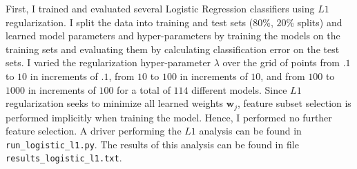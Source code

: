 \documentclass[11pt, oneside]{article}   	%
\begin{document}
First, I trained and evaluated several Logistic Regression classifiers using $L1$ regularization. I split the data into training and test sets ($80$\%, $20$\% splits) and learned model parameters and hyper-parameters by training the models on the training sets and evaluating them by calculating classification error on the test sets. I varied the regularization hyper-parameter $ \lambda $ over the grid of points from $.1$ to $10$ in increments of $.1$, from $10$ to $100$ in increments of $10$, and from $100$ to $1000$ in increments of $100$ for a total of $114$ different models. Since $L1$ regularization seeks to minimize all learned weights $\mathbf{w}_j$, feature subset selection is performed implicitly when training the model. Hence, I performed no further feature selection. A driver performing the $L1$ analysis can be found in \texttt{run\_logistic\_l1.py}. The results of this analysis can be found in file \texttt{results\_logistic\_l1.txt}.
\end{document}
